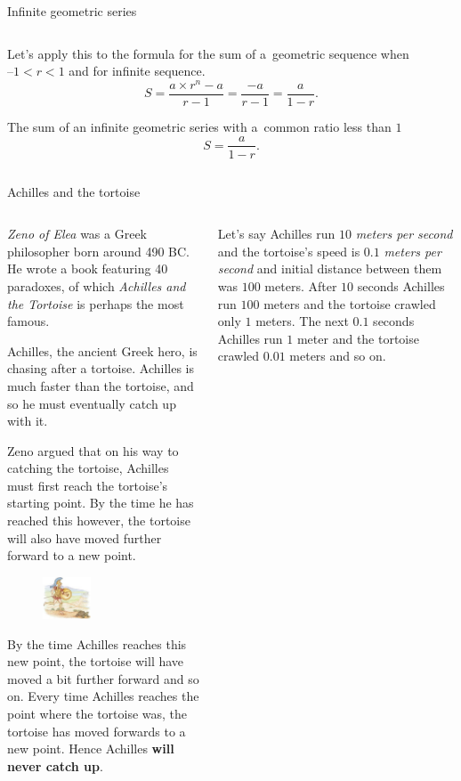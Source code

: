 \documentclass[9pt,aspectratio=169]{beamer}
\begin{document}
\begin{frame}{Infinite geometric series}
\begin{columns}[T]
\begin{column}{0.5\textwidth}
      Let’s apply this to the formula for the sum of a~geometric sequence when $–1 < r < 1$ and for infinite sequence.
      \[ S = \frac{a \times r^n - a}{r - 1} = \frac{-a}{r - 1} = \frac{a}{1 - r}. \]
      \begin{definition}
        The sum of an infinite geometric series with a~common ratio less than $1$ 
        \[ S = \frac{a}{1 - r}. \]
        \vspace*{-0.5em}
      \end{definition}
    \end{column}
  \end{columns}
\end{frame}

\begin{frame}{Achilles and the tortoise}
  \begin{columns}[T]
    \begin{column}{0.5\textwidth}
      \emph{Zeno of Elea} was a Greek philosopher born around 490 BC.  He wrote a book featuring 40 paradoxes, of which \emph{Achilles and the Tortoise} is perhaps the most famous.
      
      Achilles, the ancient Greek hero, is chasing after a tortoise. Achilles is much faster than the tortoise, and so he must eventually catch up with it. 
      
      Zeno argued that on his way to catching the tortoise, Achilles must first reach the tortoise’s starting point. By the time he has reached this however, the tortoise will also have moved further forward to a new point. 
      \begin{figure}
        \vspace*{-1.2em}
        \hspace*{-1em}
        \includegraphics[width=0.4\textwidth]{07 - Geometric Sequences/zeno.jpg}
      \end{figure}
      By the time Achilles reaches this new point, the tortoise will have moved a bit further forward and so on. Every time Achilles reaches the point where the tortoise was, the tortoise has moved forwards to a new point. Hence Achilles \textbf{will never catch up}.
    \end{column}
    \begin{column}{0.5\textwidth}
      Let’s say Achilles run $10$ \emph{meters per second} and the tortoise’s speed is $0.1$ \emph{meters per second} and initial distance between them was $100$ meters. After $10$ seconds Achilles run $100$ meters and the tortoise crawled only $1$ meters. The next $0.1$ seconds Achilles run $1$ meter and the tortoise crawled $0.01$ meters and so on. 
      

\end{column}
\end{columns}
\end{frame}
\end{document}
